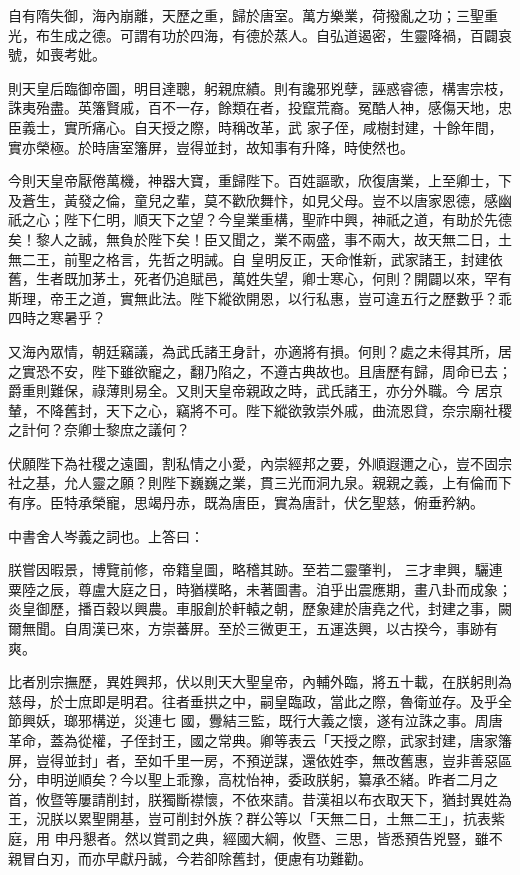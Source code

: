 \begin{pinyinscope}
 自有隋失御，海內崩離，天歷之重，歸於唐室。萬方樂業，荷撥亂之功；三聖重光，布生成之德。可謂有功於四海，有德於蒸人。自弘道遏密，生靈降禍，百闢哀號，如喪考妣。



 則天皇后臨御帝圖，明目達聰，躬親庶績。則有讒邪兇孽，誣惑睿德，構害宗枝，誅夷殆盡。英籓賢戚，百不一存，餘類在者，投竄荒裔。冤酷人神，感傷天地，忠臣義士，實所痛心。自天授之際，時稱改革，武
 家子侄，咸樹封建，十餘年間，實亦榮極。於時唐室籓屏，豈得並封，故知事有升降，時使然也。



 今則天皇帝厭倦萬機，神器大寶，重歸陛下。百姓謳歌，欣復唐業，上至卿士，下及蒼生，黃發之倫，童兒之輩，莫不歡欣舞忭，如見父母。豈不以唐家恩德，感幽祇之心；陛下仁明，順天下之望？今皇業重構，聖祚中興，神祇之道，有助於先德矣！黎人之誠，無負於陛下矣！臣又聞之，業不兩盛，事不兩大，故天無二日，土無二王，前聖之格言，先哲之明誡。自
 皇明反正，天命惟新，武家諸王，封建依舊，生者既加茅土，死者仍追賦邑，萬姓失望，卿士寒心，何則？開闢以來，罕有斯理，帝王之道，實無此法。陛下縱欲開恩，以行私惠，豈可違五行之歷數乎？乖四時之寒暑乎？



 又海內眾情，朝廷竊議，為武氏諸王身計，亦適將有損。何則？處之未得其所，居之實恐不安，陛下雖欲寵之，翻乃陷之，不遵古典故也。且唐歷有歸，周命已去；爵重則難保，祿薄則易全。又則天皇帝親政之時，武氏諸王，亦分外職。今
 居京輦，不降舊封，天下之心，竊將不可。陛下縱欲敦崇外戚，曲流恩貸，奈宗廟社稷之計何？奈卿士黎庶之議何？



 伏願陛下為社稷之遠圖，割私情之小愛，內崇經邦之要，外順遐邇之心，豈不固宗社之基，允人靈之願？則陛下巍巍之業，貫三光而洞九泉。親親之義，上有倫而下有序。臣特承榮寵，思竭丹赤，既為唐臣，實為唐計，伏乞聖慈，俯垂矜納。



 中書舍人岑義之詞也。上答曰：



 朕嘗因暇景，博覽前修，帝籍皇圖，略稽其跡。至若二靈肇判，
 三才聿興，驪連粟陸之辰，尊盧大庭之日，時猶樸略，未著圖書。洎乎出震應期，畫八卦而成象；炎皇御歷，播百穀以興農。車服創於軒轅之朝，歷象建於唐堯之代，封建之事，闕爾無聞。自周漢已來，方崇蕃屏。至於三微更王，五運迭興，以古揆今，事跡有爽。



 比者別宗撫歷，異姓興邦，伏以則天大聖皇帝，內輔外臨，將五十載，在朕躬則為慈母，於士庶即是明君。往者垂拱之中，嗣皇臨政，當此之際，魯衛並存。及乎全節興妖，瑯邪構逆，災連七
 國，釁結三監，既行大義之懷，遂有泣誅之事。周唐革命，蓋為從權，子侄封王，國之常典。卿等表云「天授之際，武家封建，唐家籓屏，豈得並封」者，至如千里一房，不預逆謀，還依姓李，無改舊惠，豈非善惡區分，申明逆順矣？今以聖上乖豫，高枕怡神，委政朕躬，纂承丕緒。昨者二月之首，攸暨等屢請削封，朕獨斷襟懷，不依來請。昔漢祖以布衣取天下，猶封異姓為王，況朕以累聖開基，豈可削封外族？群公等以「天無二日，土無二王」，抗表紫庭，用
 申丹懇者。然以賞罰之典，經國大綱，攸暨、三思，皆悉預告兇豎，雖不親冒白刃，而亦早獻丹誠，今若卻除舊封，便慮有功難勸。




\end{pinyinscope}
